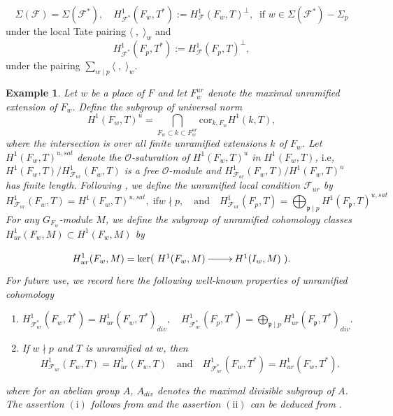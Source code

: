 \documentclass[reqno]{amsart}
\newcounter{dummy} \numberwithin{dummy}{section}
\newtheorem{exe}[dummy]{Example}
\begin{document}
$$ \Sigma(\mathcal{F})=\Sigma(\mathcal{F}^{\ast}),\quad
H^{1}_{\mathcal{F}^{\ast}}(F_{w},T^{\ast}):=H^{1}_{\mathcal{F}}(F_{w},T)^{\perp},\;\;
\mbox{if $w\in\Sigma(\mathcal{F}^{\ast})-\Sigma_{p}$}
$$
 under the local Tate pairing $\langle\;,\;\rangle_{w}$
and
$$
H^{1}_{\mathcal{F}^{\ast}}(F_{p},T^{\ast}):=H^{1}_{\mathcal{F}}(F_{p},T)^{\perp},
$$
 under the pairing $\sum_{w\mid p}\langle\;,\;\rangle_{w}$.\vskip 6pt
\begin{exe}\label{Example unramified local condition}
 Let $w$ be a place of $F$ and  let $F_{w}^{ur}$ denote the maximal
 unramified extension of $F_{w}$. Define the subgroup of universal norm
$$
H^{1}(F_{w},T)^{u}=\bigcap_{F_{w}\subset k\subset
F_{w}^{ur}}\mathrm{cor}_{k,F_{w}}H^{1}(k,T),
$$
 where the intersection is over all finite unramified extensions $k$ of $F_{w}$.
Let $H^{1}(F_{w},T)^{u,sat}$ denote the $\mathcal{O}$-saturation of
$H^{1}(F_{w},T)^{u}$ in $H^{1}(F_{w},T)$, $\mathrm{i.e}$,
$H^{1}(F_{w},T)/H^{1}_{\mathcal{F}_{ur}}(F_{w},T)$ is a free
$\mathcal{O}$-module and
$H^{1}_{\mathcal{F}_{ur}}(F_{w},T)/H^{1}(F_{w},T)^{u}$ has finite
length. Following \cite[Defintition 5.1]{MR 16}, we define the
unramified local condition $\mathcal{F}_{ur}$
 by
\begin{equation}\label{Defintion of unramified condition}
H^{1}_{\mathcal{F}_{ur}}(F_{w},T)=H^{1}(F_{w},T)^{u,sat},\;\mbox{if
$w\nmid p$},\quad\mbox{and}\quad
H^{1}_{\mathcal{F}_{ur}}(F_{p},T)={\bigoplus}_{\mathfrak{p}\mid
p}H^{1}(F_{\mathfrak{p}},T)^{u,sat}
\end{equation}
For any $G_{F_{w}}$-module $M$, we define the subgroup of unramified
cohomology classes $H^{1}_{ur}(F_{w},M)\subset H^{1}(F_{w},M)$ by

$$
H^{1}_{ur}(F_{w},M)=\ker(\xymatrix@=2pc{H^{1}(F_{w},M)\ar[r]&
H^{1}(I_{w},M)}).
$$
For future use, we record here the following well-known properties
of unramified cohomology
\begin{enumerate}[label=(\roman*)]
    \item  $H^{1}_{\mathcal{F}_{ur}^{\ast}}(F_{w},T^{\ast})=H^{1}_{ur}(F_{w},T^{\ast})_{div},\quad H^{1}_{\mathcal{F}_{ur}^{\ast}}(F_{p},T^{\ast})={\bigoplus}_{\mathfrak{p}\mid
p}H^{1}_{ur}(F_{\mathfrak{p}},T^{\ast})_{div}.$
    \item If $w\nmid p$ and $T$ is
unramified at $w$, then
$$
H^{1}_{\mathcal{F}_{ur}}(F_{w},T)=H^{1}_{ur}(F_{w},T)\quad\mbox{and}\quad
H^{1}_{\mathcal{F}_{ur}^{\ast}}(F_{w},T^{\ast})=H^{1}_{ur}(F_{w},T^{\ast}).
$$
\end{enumerate}
 where for an
abelian group $A$, $A_{div}$ denotes the maximal divisible subgroup
of $A$.\\
The assertion $(\textrm{i})$ follows from \cite[\S 2.1.1,
Lemme]{PR92} and the assertion $(\textrm{ii})$ can be deduced from
\cite[Lemma 1.3.5]{Rubin00}.
\end{exe}
\end{document}
